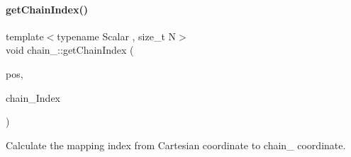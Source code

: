 \paragraph{\texorpdfstring{get\+Chain\+Index()}{getChainIndex()}}
{\footnotesize\ttfamily template$<$typename Scalar , size\+\_\+t N$>$ \\
void chain_\+::get\+Chain\+Index (\begin{DoxyParamCaption}\item[{const \mbox{\hyperlink{namespacechain_aa715d2f046187ea9f0c3ea55605d6214}{Vector\+Array}}$<$ Scalar, N $>$ \&}]{pos,  }\item[{\mbox{\hyperlink{namespacechain_aa40d2da395c0ac2bc5f37832442ac403}{Index\+Array}}$<$ N $>$ \&}]{chain_\+Index }\end{DoxyParamCaption})}



Calculate the mapping index from Cartesian coordinate to chain_ coordinate.

